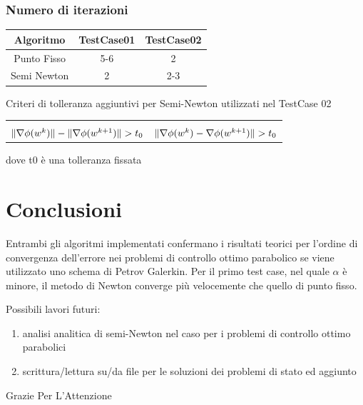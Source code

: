 \documentclass{beamer}
\theoremstyle{definition}
\theoremstyle{remark}
\theoremstyle{plain}
\theoremstyle{definition}
\DeclarePairedDelimiter{\norma}{\lVert}{\rVert}
\begin{document}
\begin{frame}
\frametitle{Numero di iterazioni}

\begin{table}
\centering
\begin{tabular}{|c|c|c|}
\hline
\textbf{Algoritmo} & \textbf{TestCase01} & \textbf{TestCase02}\\
\hline
Punto Fisso & 5-6 & 2 \\
\hline
Semi Newton & 2 & 2-3 \\
\hline
\end{tabular}
\end{table}

Criteri di tolleranza aggiuntivi per Semi-Newton utilizzati nel TestCase 02
\begin{tabular}{cc}
 & \\
$\norma{\nabla\phi(w^k)} - \norma{\nabla\phi(w^{k+1})} > t_0$ & $\norma{\nabla\phi(w^k) - \nabla\phi(w^{k+1})} > t_0$
\end{tabular}
dove t0 è una tolleranza fissata
\end{frame}

\section{Conclusioni}
\begin{frame}
Entrambi gli algoritmi implementati confermano i risultati teorici per l'ordine di convergenza dell'errore nei problemi di controllo ottimo parabolico se viene utilizzato uno schema di Petrov Galerkin.
Per il primo test case, nel quale $\alpha$ è minore, il metodo di Newton converge più velocemente che quello di punto fisso.

Possibili lavori futuri:
\begin{enumerate}
\item analisi analitica di semi-Newton nel caso per i problemi di controllo ottimo parabolici
\item scrittura/lettura su/da file per le soluzioni dei problemi di stato ed aggiunto
\end{enumerate}

\end{frame}

\begin{frame}
\centering
Grazie Per L'Attenzione
\end{frame}
\end{document}
